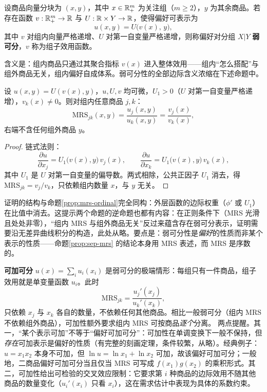 \begin{definition}[弱可分性]
\label{def:weak-sep}
设商品向量分块为 $(x,y)$，其中 $x\in\mathbb{R}^m_+$ 为关注组（$m\ge2$），$y$ 为其余商品。若存在函数 $v:\mathbb{R}^m_+\to\mathbb{R}$ 与 $U:\mathbb{R}\times Y\to\mathbb{R}$，使得偏好可表示为
\[
 u(x,y)=U\big(v(x),\,y\big),
\]
其中 $v$ 对组内向量严格递增、$U$ 对第一自变量严格递增，则称偏好对分组 $X|Y$ \textbf{弱可分}，$v$ 称为组子效用函数。
\end{definition}

含义是：组内商品只通过其聚合指标 $v(x)$ 进入整体效用——组内“怎么搭配”与组外商品无关，组内偏好自成体系。弱可分性的全部边际含义浓缩在下述命题中。

\begin{proposition}
\label{prop:sep-mrs}
设 $u(x,y)=U(v(x),y)$，$u,U,v$ 均可微，$U_1>0$（$U$ 对第一自变量严格递增），$v_k(x)\ne0$。则对组内任意商品 $j,k$：
\[
 \mathrm{MRS}_{jk}(x,y)=\frac{u_j(x,y)}{u_k(x,y)}
 =\frac{v_j(x)}{v_k(x)},
\]
右端不含任何组外商品 $y$。
\end{proposition}
\begin{proof}
链式法则：
\[
 \frac{\partial u}{\partial x_j}
 =U_1\big(v(x),y\big)\,v_j(x),
 \qquad
 \frac{\partial u}{\partial x_k}
 =U_1\big(v(x),y\big)\,v_k(x),
\]
其中 $U_1$ 是 $U$ 对第一自变量的偏导数。两式相除，公共正因子 $U_1$ 消去，得 $\mathrm{MRS}_{jk}=v_j/v_k$，只依赖组内数量 $x$，与 $y$ 无关。
\end{proof}

证明的结构与命题\ref{prop:mrs-ordinal}完全同构：外层函数的边际权重（$\phi'$ 或 $U_1$）在比值中消去。这提示两个命题的逆命题也都有内容：在正则条件下（MRS 光滑且处处非零），“组内 MRS 与组外商品无关”反过来蕴含存在弱可分表示，证明需要沿无差异曲线积分的构造，此处从略。要点是：弱可分性是\emph{偏好}的性质而非某个表示的性质——命题\ref{prop:sep-mrs} 的结论本身用 MRS 表述，而 MRS 是序数的。

\begin{remark}
\label{rem:additive}
\textbf{可加可分} $u(x)=\sum_{i}u_i(x_i)$ 是弱可分的极端情形：每组只有一件商品，组子效用就是单变量函数 $u_i$。此时
\[
 \mathrm{MRS}_{jk}=\frac{u_j'(x_j)}{u_k'(x_k)},
\]
只依赖 $x_j$ 与 $x_k$ 各自的数量，不依赖任何其他商品。相比一般弱可分（组内 MRS 不依赖组外商品），可加性额外要求组内 MRS 可按商品\emph{逐个}分离。
两点提醒。其一，“某个表示可加”不等于“偏好可加可分”：可加性在单调变换下一般不保持，但\emph{存在}可加表示是偏好的性质（有完整的刻画定理，条件较繁，从略）。经典例子：$u=x_1x_2$ 本身不可加，但 $\ln u=\ln x_1+\ln x_2$ 可加，故该偏好可加可分；一般地，二商品偏好可加可分当且仅当 MRS 可写成 $f(x_1)g(x_2)$ 的乘积形式。其二，可加性给出可检验的交叉效应限制：它要求第 $i$ 种商品的边际效用不随其他商品的数量变化（$u_i'(x_i)$ 只看 $x_i$），这在需求估计中表现为具体的系数约束。
\end{remark}

